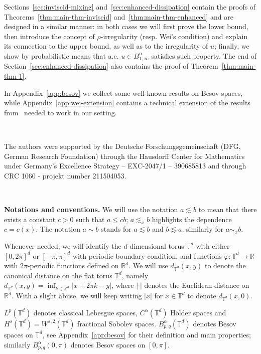 \documentclass[11pt,oneside,reqno]{amsart}
\newcommand{\tmstrong}[1]{\textbf{#1}}
\newcommand{\tmtextbf}[1]{\text{{\bfseries{#1}}}}
\numberwithin{equation}{section}
\begin{document}
Sections~\ref{sec:inviscid-mixing} and~\ref{sec:enhanced-dissipation} contain
the proofs of Theorems~\ref{thm:main-thm-inviscid}
and~\ref{thm:main-thm-enhanced} and are designed in a similar manner: in both
cases we will first prove the lower bound, then introduce the concept of
$\rho$-irregularity (resp. Wei's condition) and explain its connection to the
upper bound, as well as to the irregularity of $u$; finally, we show by
probabilistic means that a.e. $u \in B^{\alpha}_{1, \infty}$ satisfies such
property. The end of Section~\ref{sec:enhanced-dissipation} also contains the
proof of Theorem~\ref{thm:main-thm-1}.

In Appendix~\ref{app:besov} we collect some well known results on Besov
spaces, while Appendix~\ref{app:wei-extension} contains a technical extension
of the results from~{\cite{wei}} needed to work in our setting.

\

\tmtextbf{Acknowledgments.} The authors were supported by the Deutsche
Forschungsgemeinschaft (DFG, German Research Foundation) through the Hausdorff
Center for Mathematics under Germany's Excellence Strategy -- EXC-2047/1 --
390685813 and through CRC 1060 - projekt number 211504053.

\

{\tmstrong{Notations and conventions.}} We will use the notation $a \lesssim
b$ to mean that there exists a constant $c > 0$ such that $a \leqslant c b$;
$a \lesssim_x b$ highlights the dependence $c = c (x)$. The notation $a \sim
b$ stands for $a \lesssim b$ and $b \lesssim a$, similarly for $a \sim_x b$.

Whenever needed, we will identify the $d$-dimensional torus $\mathbb{T}^d$
with either $[0, 2 \pi]^d$ or $[- \pi, \pi]^d$ with periodic boundary
condition, and functions $\varphi : \mathbb{T}^d \rightarrow \mathbb{R}$ with
$2 \pi$-periodic functions defined on $\mathbb{R}^d$. We will use
$d_{\mathbb{T}^d} (x, y)$ to denote the canonical distance on the flat torus
$\mathbb{T}^d$, namely $d_{\mathbb{T}^d} (x, y) = \inf_{k \in \mathbb{Z}^d} |
x + 2 \pi k - y |$, where $| \cdot |$ denotes the Euclidean distance on
$\mathbb{R}^d$. With a slight abuse, we will keep writing $| x |$ for $x \in
\mathbb{T}^d$ to denote $d_{\mathbb{T}^d} (x, 0)$.

$L^p (\mathbb{T}^d)$ denotes classical Lebesgue spaces, $C^{\alpha}
(\mathbb{T}^d)$ H\"{o}lder spaces and $H^s (\mathbb{T}^d) = W^{s, 2}
(\mathbb{T}^d)$ fractional Sobolev spaces. $B^{\alpha}_{p, q} (\mathbb{T}^d)$
denotes Besov spaces on $\mathbb{T}^d$, see Appendix~\ref{app:besov} for their
definition and main properties; similarly $B^{\alpha}_{p, q} (0, \pi)$ denotes
Besov spaces on $[0,
\pi]$.
\end{document}
